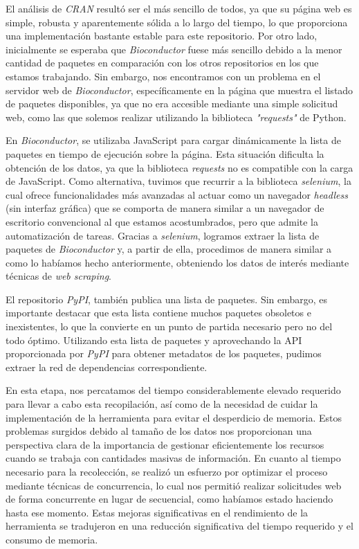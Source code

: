 El análisis de \textit{CRAN} resultó ser el más sencillo de todos, ya que su página web es simple, robusta y aparentemente 
sólida a lo largo del tiempo, lo que proporciona una implementación bastante estable para este repositorio. Por otro 
lado, inicialmente se esperaba que \textit{Bioconductor} fuese más sencillo debido a la menor cantidad de paquetes en 
comparación con los otros repositorios en los que estamos trabajando. Sin embargo, nos encontramos con un problema en 
el servidor web de \textit{Bioconductor}, específicamente en la página que muestra el listado de paquetes disponibles, 
ya que no era accesible mediante una simple solicitud web, como las que solemos realizar utilizando la biblioteca 
\textit{"requests"} de Python.

En \textit{Bioconductor}, se utilizaba JavaScript para cargar dinámicamente la lista de paquetes en tiempo de ejecución 
sobre la página. Esta situación dificulta la obtención de los datos, ya que la biblioteca \textit{requests} no es 
compatible con la carga de JavaScript. Como alternativa, tuvimos que recurrir a la biblioteca \textit{selenium}, la 
cual ofrece funcionalidades más avanzadas al actuar como un navegador \textit{headless} (sin interfaz gráfica) que 
se comporta de manera similar a un navegador de escritorio convencional al que estamos acostumbrados, pero que admite 
la automatización de tareas. Gracias a \textit{selenium}, logramos extraer la lista de paquetes de \textit{Bioconductor} 
y, a partir de ella, procedimos de manera similar a como lo habíamos hecho anteriormente, obteniendo los datos de interés 
mediante técnicas de \textit{web scraping}.

El repositorio \textit{PyPI}, también publica una lista de paquetes. Sin embargo, es importante destacar que esta 
lista contiene muchos paquetes obsoletos e inexistentes, lo que la convierte en un punto de partida necesario pero 
no del todo óptimo. Utilizando esta lista de paquetes y aprovechando la API proporcionada por \textit{PyPI} para 
obtener metadatos de los paquetes, pudimos extraer la red de dependencias correspondiente.

En esta etapa, nos percatamos del tiempo considerablemente elevado requerido para llevar a cabo esta recopilación, 
así como de la necesidad de cuidar la implementación de la herramienta para evitar el desperdicio de memoria. 
Estos problemas surgidos debido al tamaño de los datos nos proporcionan una perspectiva clara de la importancia de 
gestionar eficientemente los recursos cuando se trabaja con cantidades masivas de información. En cuanto al tiempo 
necesario para la recolección, se realizó un esfuerzo por optimizar el proceso mediante técnicas de concurrencia, 
lo cual nos permitió realizar solicitudes web de forma concurrente en lugar de secuencial, como habíamos estado haciendo 
hasta ese momento. Estas mejoras significativas en el rendimiento de la herramienta se tradujeron en una reducción 
significativa del tiempo requerido y el consumo de memoria.

